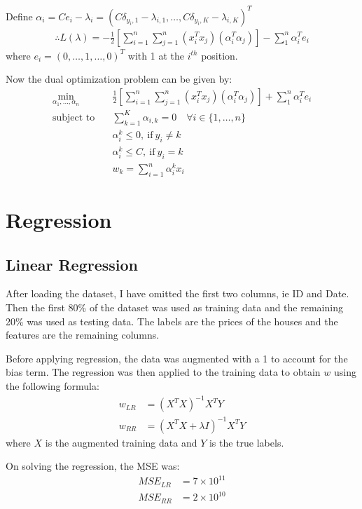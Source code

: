 \documentclass[12pt]{article}
\begin{document}
Define $\alpha_i = C e_i - \lambda_i = (C \delta_{y_i,1} - \lambda_{i,1}, \dots , C \delta_{y_i,K} - \lambda_{i,K})^T$
\begin{align*}
    \therefore L(\lambda) = - \frac{1}{2} \left[\sum_{i=1}^{n} \sum_{j=1}^{n} (x_i^T x_j) (\alpha_i^T \alpha_j)\right] - \sum_{1}^{n} \alpha_i^T e_i
\end{align*}
where $e_i = (0, \dots, 1, \dots, 0)^T$ with 1 at the $i^{th}$ position.

Now the dual optimization problem can be given by:
\begin{align*}
    \min_{\alpha_1, \dots, \alpha_n} \quad &\frac{1}{2} \left[\sum_{i=1}^{n} \sum_{j=1}^{n} (x_i^T x_j) (\alpha_i^T \alpha_j)\right] + \sum_{1}^{n} \alpha_i^T e_i \\
    \text{subject to} \quad &\sum_{k=1}^{K} \alpha_{i,k} = 0 \quad \forall i \in \{1, \dots, n\}\\
    &\alpha_i^k \le 0, \ \text{if} \ y_i \ne k \\
    &\alpha_i^k \le C, \ \text{if} \ y_i = k \\
    &w_k = \sum_{i=1}^{n} \alpha_i^k x_i
\end{align*}


\section{Regression}
\subsection{Linear Regression}
After loading the dataset, I have omitted the first two columns, ie ID and Date. Then the first 80\% of the dataset was used as training data and the remaining 20\% was used as testing data. The labels are the prices of the houses and the features are the remaining columns.

Before applying regression, the data was augmented with a 1 to account for the bias term. The regression was then applied to the training data to obtain $w$ using the following formula:
\begin{align*}
    w_{LR} &= (X^TX)^{-1}X^TY \\
    w_{RR} &= (X^TX + \lambda I)^{-1}X^TY
\end{align*}
where $X$ is the augmented training data and $Y$ is the true labels.

On solving the regression, the MSE was:
\begin{align*}
    MSE_{LR} &= 7 \times 10^{11} \\
    MSE_{RR} &= 2 \times 10^{10}
\end{align*}
\end{document}
